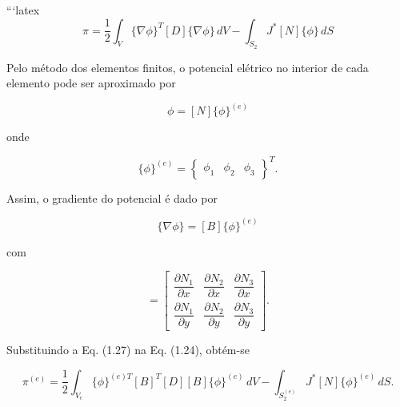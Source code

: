\documentclass[
12pt,
a4paper,
oneside,
chapter=TITLE,
sumario=tradicional
]{abntex2}
\begin{document}
    ```latex
    \begin{equation}
    	\pi =
    	\frac{1}{2}
    	\int_V
    	\{\nabla \phi\}^{T}
    	[D]
    	\{\nabla \phi\}
    	\,dV
    	-
    	\int_{S_2}
    	J^{*}
    	[N]\{\phi\}
    	\,dS
    	\tag{1.24}
    \end{equation}
    
    Pelo método dos elementos finitos, o potencial elétrico no interior de cada elemento pode ser aproximado por
    
    \begin{equation}
    	\phi =
    	[N]\{\phi\}^{(e)}
    	\tag{1.25}
    \end{equation}
    
    onde
    
    \begin{equation}
    	\{\phi\}^{(e)}
    	=
    	\begin{Bmatrix}
    		\phi_1 & \phi_2 & \phi_3
    	\end{Bmatrix}^{T}.
    	\tag{1.26}
    \end{equation}
    
    Assim, o gradiente do potencial é dado por
    
    \begin{equation}
    	\{\nabla \phi\}
    	=
    	[B]\{\phi\}^{(e)}
    	\tag{1.27}
    \end{equation}
    
    com
    
    \begin{equation}
    	[B]
    	=
    	\begin{bmatrix}
    		\dfrac{\partial N_1}{\partial x} &
    		\dfrac{\partial N_2}{\partial x} &
    		\dfrac{\partial N_3}{\partial x}
    		\\[6pt]
    		\dfrac{\partial N_1}{\partial y} &
    		\dfrac{\partial N_2}{\partial y} &
    		\dfrac{\partial N_3}{\partial y}
    	\end{bmatrix}.
    	\tag{1.28}
    \end{equation}
    
    Substituindo a Eq. (1.27) na Eq. (1.24), obtém-se
    
    \begin{equation}
    	\pi^{(e)}
    	=
    	\frac{1}{2}
    	\int_{V_e}
    	\{\phi\}^{(e)T}
    	[B]^T[D][B]
    	\{\phi\}^{(e)}
    	\,dV
    	-
    	\int_{S_2^{(e)}}
    	J^{*}
    	[N]\{\phi\}^{(e)}
    	\,dS .
    	\tag{1.29}
    \end{equation}
    
\end{document}
